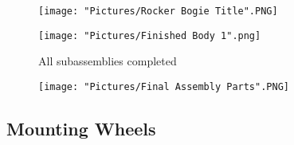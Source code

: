 \documentclass[12pt]{article}
\begin{document}
\begin{figure}[H]
  \centering
  \begin{minipage}[b]{0.45\textwidth}
    \texttt{[image: "Pictures/Rocker Bogie Title".PNG]}
  \end{minipage}
  \hfill
  \begin{minipage}[b]{0.45\textwidth}
    \texttt{[image: "Pictures/Finished Body 1".png]}
  \end{minipage}
  \caption{All subassemblies completed}
\end{figure}


\begin{figure}[H]
	\centering
	\texttt{[image: "Pictures/Final Assembly Parts".PNG]}
\end{figure}


\subsection{Mounting Wheels}
\end{document}
